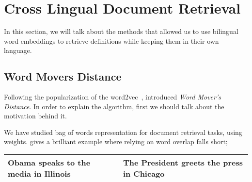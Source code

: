\section{Cross Lingual Document Retrieval}%
\label{sec:cross_lingual_document_retrival}

In this section, we will talk about the methods that allowed us to use bilingual word embeddings to retrieve definitions while keeping them in their own language.

\subsection{Word Movers Distance}%
\label{sub:word_movers_distance}

Following the popularization of the word2vec~\cite{mikolovDistributed2013}, \textcite{kusnerWord2015} introduced \emph{Word Mover's Distance}.
In order to explain the algorithm, first we should talk about the motivation behind it.

We have studied bag of words representation for document retrieval tasks, using \tfidf{} weights.
\citeauthor{kusnerWord2015} gives a brilliant example where relying on word overlap falls short;

\begin{tabular}{l l}
    \midrule
    Obama speaks to the media in Illinois & The President greets the press in Chicago \\
    \midrule
\end{tabular}

